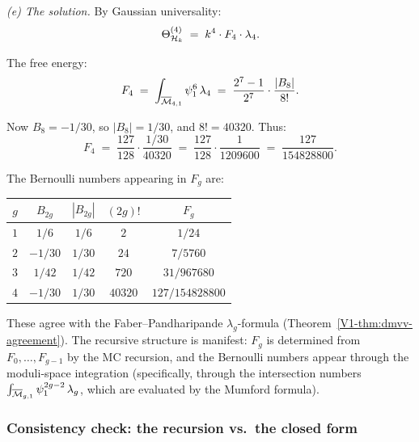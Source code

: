 \begin{computation}
\medskip\noindent\emph{(e) The solution.}
By Gaussian universality:
\begin{equation}%
\Theta^{(4)}_{\cH_k}
\;=\;
k^4 \cdot F_4 \cdot \lambda_4.
\end{equation}

The free energy:
\begin{equation}%
F_4
\;=\;
\int_{\overline{\cM}_{4,1}} \psi_1^{6}\,\lambda_4
\;=\;
\frac{2^7 - 1}{2^7} \cdot \frac{|B_8|}{8!}.
\end{equation}

Now $B_8 = -1/30$, so $|B_8| = 1/30$, and $8! = 40320$. Thus:
\begin{equation}%
F_4
\;=\;
\frac{127}{128} \cdot \frac{1/30}{40320}
\;=\;
\frac{127}{128} \cdot \frac{1}{1209600}
\;=\;
\frac{127}{154828800}.
\end{equation}
\end{computation}

\begin{remark}
The Bernoulli numbers appearing in $F_g$ are:
\begin{center}
\begin{tabular}{ccccc}
$g$ & $B_{2g}$ & $|B_{2g}|$ & $(2g)!$ & $F_g$ \\
\hline
$1$ & $1/6$ & $1/6$ & $2$ & $1/24$ \\
$2$ & $-1/30$ & $1/30$ & $24$ & $7/5760$ \\
$3$ & $1/42$ & $1/42$ & $720$ & $31/967680$ \\
$4$ & $-1/30$ & $1/30$ & $40320$ & $127/154828800$
\end{tabular}
\end{center}
These agree with the Faber--Pandharipande $\lambda_g$-formula
(Theorem~\ref{V1-thm:dmvv-agreement}). The recursive structure
is manifest: $F_g$ is determined from $F_0, \ldots, F_{g-1}$
by the MC recursion, and the Bernoulli numbers appear through
the moduli-space integration (specifically, through the
intersection numbers $\int_{\overline{\mathcal{M}}_{g,1}}
\psi_1^{2g-2}\,\lambda_g$, which are evaluated by the Mumford
formula).
\end{remark}

\subsubsection{Consistency check: the recursion vs.\ the closed form}

